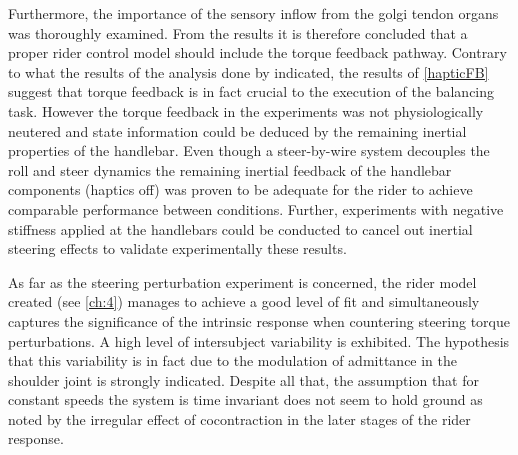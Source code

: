 Furthermore, the importance of the sensory inflow from the golgi tendon organs was thoroughly examined. From the results it is therefore concluded that a proper rider control model should include the torque feedback pathway. Contrary to what  the results of the analysis done by \citet{dialynaseffect} indicated, the results of \cref{hapticFB} suggest that torque feedback is in fact crucial to the execution of the balancing task. However the torque feedback in the experiments was not physiologically neutered and  state information could be deduced by the remaining inertial properties of the handlebar. Even though a steer-by-wire system decouples the roll and steer dynamics the remaining inertial feedback of the handlebar components (haptics off) was proven to be adequate for the rider to achieve comparable performance between conditions. Further, experiments with negative stiffness applied at the handlebars could be conducted to cancel out inertial steering effects to validate experimentally these results.
 
 
As far as the steering perturbation experiment is concerned, the rider model created (see \cref{ch:4}) manages to achieve a good level of fit and simultaneously captures the significance of the intrinsic response when countering steering torque perturbations. A high level of intersubject variability is exhibited. The hypothesis that this variability is in fact due to the modulation of admittance in the shoulder joint is strongly indicated. Despite all that,  the assumption that for constant speeds the system is time invariant does not seem to hold ground as noted by the irregular effect of cocontraction in the later stages of the rider  response.


